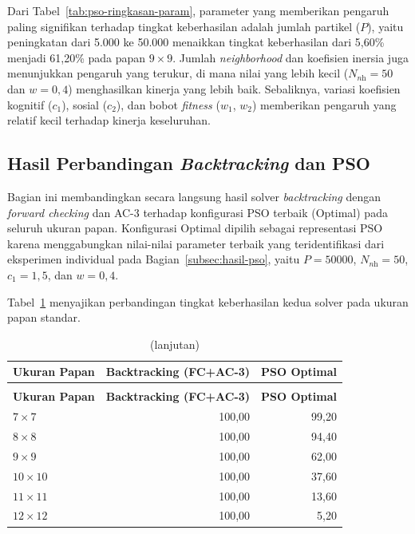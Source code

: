 Dari Tabel~\ref{tab:pso-ringkasan-param}, parameter yang memberikan pengaruh paling signifikan terhadap tingkat keberhasilan adalah jumlah partikel ($P$), yaitu peningkatan dari 5.000 ke 50.000 menaikkan tingkat keberhasilan dari 5,60\% menjadi 61,20\% pada papan $9 \times 9$. Jumlah \textit{neighborhood} dan koefisien inersia juga menunjukkan pengaruh yang terukur, di mana nilai yang lebih kecil ($N_{\textit{nh}} = 50$ dan $w = 0{,}4$) menghasilkan kinerja yang lebih baik. Sebaliknya, variasi koefisien kognitif ($c_1$), sosial ($c_2$), dan bobot \textit{fitness} ($w_1$, $w_2$) memberikan pengaruh yang relatif kecil terhadap kinerja keseluruhan.

\subsection{Hasil Perbandingan \textit{Backtracking} dan PSO}
\label{subsec:hasil-perbandingan}

Bagian ini membandingkan secara langsung hasil solver \textit{backtracking} dengan \textit{forward checking} dan AC-3 terhadap konfigurasi PSO terbaik (Optimal) pada seluruh ukuran papan. Konfigurasi Optimal dipilih sebagai representasi PSO karena menggabungkan nilai-nilai parameter terbaik yang teridentifikasi dari eksperimen individual pada Bagian~\ref{subsec:hasil-pso}, yaitu $P = 50000$, $N_{\textit{nh}} = 50$, $c_1 = 1{,}5$, dan $w = 0{,}4$.

Tabel~\ref{tab:perbandingan-sr} menyajikan perbandingan tingkat keberhasilan kedua solver pada ukuran papan standar.

\begin{longtable}{lrr}
	\caption{Perbandingan tingkat keberhasilan (\%) \textit{Backtracking} dan PSO Optimal}
	\label{tab:perbandingan-sr} \\
	\toprule
	\textbf{Ukuran Papan} & \textbf{Backtracking (FC+AC-3)} & \textbf{PSO Optimal} \\
	\midrule
	\endfirsthead
	\caption[]{(lanjutan)} \\
	\toprule
	\textbf{Ukuran Papan} & \textbf{Backtracking (FC+AC-3)} & \textbf{PSO Optimal} \\
	\midrule
	\endhead
	\bottomrule
	\endfoot
	$7 \times 7$   & 100,00 & 99,20 \\
	$8 \times 8$   & 100,00 & 94,40 \\
	$9 \times 9$   & 100,00 & 62,00 \\
	$10 \times 10$ & 100,00 & 37,60 \\
	$11 \times 11$ & 100,00 & 13,60 \\
	$12 \times 12$ & 100,00 &  5,20 \\
\end{longtable}

